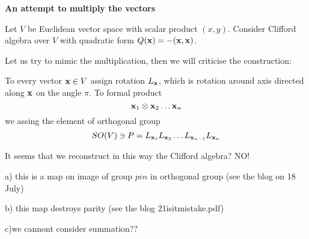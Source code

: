 



\baselineskip=14pt
\def\vare {\varepsilon}
\def\t {\tilde}
\def\a {\alpha}
\def\K {{\bf K}}
\def\N {{\bf N}}
\def\C {{\bf C}}
\def\L {{\cal L}}
\def\E {{\bf E}}
\def\s {{\sigma}}
\def\S {{\Sigma}}
\def\p{\partial}
\def\vare{{\varepsilon}}
\def\Q {{\bf Q}}
\def\D {{\cal D}}
\def\G {{\Gamma}}
\def\Z {{\bf Z}}
\def\R  {{\bf R}}
\def\l {\lambda}
\def\ll {{\bf l}}
\def\degree {{\bf {\rm degree}\,\,}}
\def \finish {${\,\,\vrule height1mm depth2mm width 8pt}$}
\def \m {\medskip}
\def\p {\partial}
\def\r {{\bf r}}
\def\pt {{\bf p}}
\def\v {{\bf v}}
\def\n {{\bf n}}
\def\t {{\bf t}}
\def\b {{\bf b}}
\def\c {{\bf c }}
\def\e{{\bf e}}
\def\f{{\bf f}}
\def\ac {{\bf a}}
\def \X   {{\bf X}}
\def \Y   {{\bf Y}}
\def \x   {{\bf x}}
\def \y   {{\bf y}}
\def\w {{\omega}}
\def \Tr  {{\rm Tr\,}}
\def\dim {{\rm dim\,\,}}
\def\t {{\tilde}} 
\def\dist {{\hbox{\tt "distance"}}}
\def  \dim {{\rm dim\,}}
\def  \Im  {{\rm Im\,}}
\def  \ker {{\rm ker\,}}


\def \Cl {\hbox{\tt Cliff}}

\centerline   {\bf An attempt to multiply the vectors}

Let $V$ be Euclidean vector space with scalar product $(x,y)$.
      Consider Clifford algebra over $V$ with quadratic form
                  $Q(\x)=-(\x,\x)$.

     Let us try to mimic the multiplication,
then we will criticise the construction:
 
    To every vector $\x\in V$ assign rotation
$L_\x$, which is rotation  around axis directed along $\x$ 
on the angle $\pi$.
  To formal product
   $$
 \x_1\otimes \x_2\dots \x_n
  $$
we assing the element of orthogonal group
             $$
  SO(V)\ni P=
 L_{\x_1}
 L_{\x_2}\dots
 L_{\x_{n-1}}
 L_{\x_{n}}
              $$       

It seems that we reconstruct in this way the Clifford algebra? NO!

a) this is a map on image of group $pin$ in orthogonal group
(see the blog on 18 July)


b) this map destroys parity (see the blog 21isitmistake.pdf)

c)we cannont consider summation??


 \bye 


